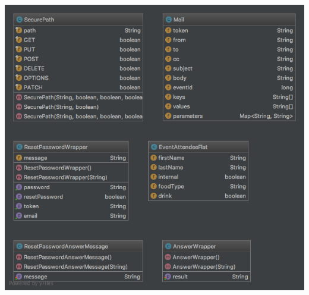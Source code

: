 \documentclass[11pt]{article} %
\begin{document}
\includegraphics[width=1.0\textwidth]{class-diagrams/Eventmanagement-Models}
\\
\\
\end{document}
